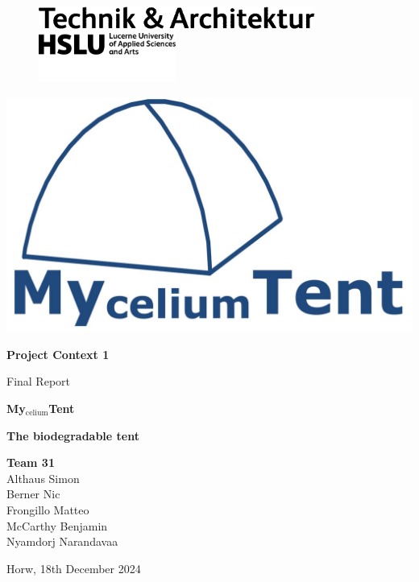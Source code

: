 \documentclass{article}
\begin{document}
\hypersetup{citecolor=black}

\begin{titlepage}
    \begin{figure}
        \hspace*{.01cm}
        \includegraphics[width=.3\textwidth]{media/hslu-logo-2.png}

        \vspace*{.01cm}
        \hspace*{.16cm}\includegraphics[width=0.4\textwidth]{media/hslu-svg-logo.png}
    \end{figure}

    \phantom{}
    \vspace*{-1cm}

    \begin{flushright}
        \includegraphics[width=.3\textwidth]{media/mytent_logo.jpeg}
    \end{flushright}

    \wrapfill

    \vspace*{-3.5cm}
    {\huge \textbf{Project Context 1}}

    {\Large Final Report}

    \vspace*{3cm}
    \begin{center}
        {\Huge \textbf{My$_{\text{celium}}$Tent}}

        \vspace*{.1cm}
        \textbf{\large The biodegradable tent}
    \end{center}

    \vfill
    {\Large \textbf{Team 31}}\\
    {\large \vspace*{.01cm}
        Althaus Simon\\
        \vspace*{.01cm}
        Berner Nic\\
        \vspace*{.01cm}   
        Frongillo Matteo\\
        \vspace*{.01cm}
        McCarthy Benjamin\\
        \vspace*{.01cm}
        Nyamdorj Narandavaa\\
        \vspace*{.01cm}
    }
    
    \vspace{1cm}
    {\large Horw, 18th December 2024}
\end{titlepage}
\end{document}
